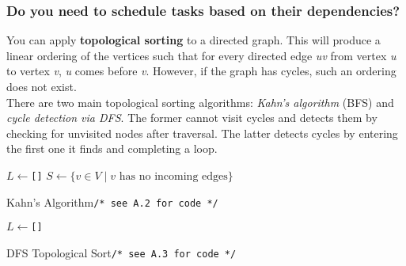 \documentclass[12pt, titlepage]{article}
\begin{document}
\subsubsection{Do you need to schedule tasks based on their dependencies?}

You can apply \textbf{topological sorting} to a directed graph. This will produce a linear ordering of the vertices such that for every directed edge \textit{uv} from vertex \textit{u} to vertex \textit{v}, \textit{u} comes before \textit{v}. However, if the graph has cycles, such an ordering does not exist.\medskip\\

There are two main topological sorting algorithms: \textit{Kahn's algorithm} (BFS) and \textit{cycle detection via DFS}. The former cannot visit cycles and detects them by checking for unvisited nodes after traversal. The latter detects cycles by entering the first one it finds and completing a loop.\\

\begin{algorithm}[H]
  \SetAlgoLined
  \DontPrintSemicolon
  $L \longleftarrow$\hspace{0.5mm}\texttt{[]}\;
  $S \longleftarrow \{v \in V \mid v \text{ has no incoming edges}\}$\;
  \caption{Kahn's Algorithm\hspace{13mm}\texttt{/* see A.2 for code */}}
\end{algorithm}
\bigskip

\begin{algorithm}[H]
  \SetAlgoLined
  \DontPrintSemicolon
  $L \longleftarrow$\hspace{0.5mm}\texttt{[]}\;
  \;
  \caption{DFS Topological Sort\hspace{8mm}\texttt{/* see A.3 for code */}}
\end{algorithm}
\end{document}
